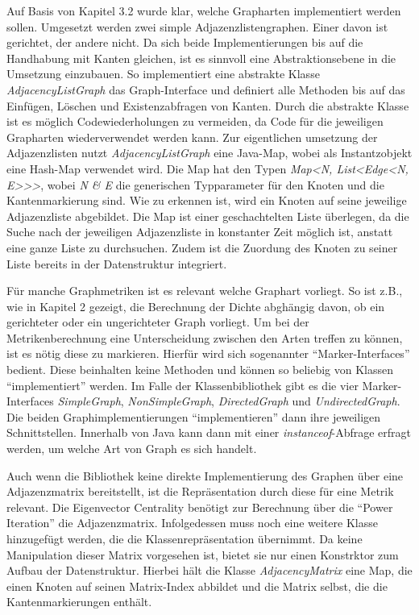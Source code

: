 \documentclass[a4paper,12pt,ngerman,chapterprefix=false,listof=totoc,bibliography=totoc]{scrreprt}
\begin{document}
{{{Auf Basis von Kapitel 3.2 wurde klar, welche Grapharten implementiert werden sollen. Umgesetzt werden zwei simple Adjazenzlistengraphen. Einer davon ist gerichtet, der andere nicht. Da sich beide Implementierungen bis auf die Handhabung mit Kanten gleichen, ist es sinnvoll eine Abstraktionsebene in die Umsetzung einzubauen. So implementiert eine abstrakte Klasse \textit{AdjacencyListGraph} das Graph-Interface und definiert alle Methoden bis auf das Einfügen, Löschen und Existenzabfragen von Kanten. Durch die abstrakte Klasse ist es möglich Codewiederholungen zu vermeiden, da Code für die jeweiligen Grapharten wiederverwendet werden kann. Zur eigentlichen umsetzung der Adjazenzlisten nutzt \textit{AdjacencyListGraph} eine Java-Map, wobei als Instantzobjekt eine Hash-Map verwendet wird. Die Map hat den Typen \textit{Map\textless N, List\textless Edge\textless N, E\textgreater\textgreater\textgreater}, wobei \textit{N \& E} die generischen Typparameter für den Knoten und die Kantenmarkierung sind. Wie zu erkennen ist, wird ein Knoten auf seine jeweilige Adjazenzliste abgebildet. Die Map ist einer geschachtelten Liste überlegen, da die Suche nach der jeweiligen Adjazenzliste in konstanter Zeit möglich ist, anstatt eine ganze Liste zu durchsuchen. Zudem ist die Zuordung des Knoten zu seiner Liste bereits in der Datenstruktur integriert.

Für manche Graphmetriken ist es relevant welche Graphart vorliegt. So ist z.B., wie in Kapitel 2 gezeigt, die Berechnung der Dichte abghängig davon, ob ein gerichteter oder ein ungerichteter Graph vorliegt. Um bei der Metrikenberechnung eine Unterscheidung zwischen den Arten treffen zu können, ist es nötig diese zu markieren. Hierfür wird sich sogenannter "`Marker-Interfaces"' bedient. Diese beinhalten keine Methoden und können so beliebig von Klassen "`implementiert"' werden. Im Falle der Klassenbibliothek gibt es die vier Marker-Interfaces \textit{SimpleGraph}, \textit{NonSimpleGraph}, \textit{DirectedGraph} und \textit{UndirectedGraph}. Die beiden Graphimplementierungen "`implementieren"' dann ihre jeweiligen Schnittstellen. Innerhalb von Java kann dann mit einer \textit{instanceof}-Abfrage erfragt werden, um welche Art von Graph es sich handelt.

Auch wenn die Bibliothek keine direkte Implementierung des Graphen über eine Adjazenzmatrix bereitstellt, ist die Repräsentation durch diese für eine Metrik relevant. Die Eigenvector Centrality benötigt zur Berechnung über die "`Power Iteration"' die Adjazenzmatrix. Infolgedessen muss noch eine weitere Klasse hinzugefügt werden, die die Klassenrepräsentation übernimmt. Da keine Manipulation dieser Matrix vorgesehen ist, bietet sie nur einen Konstrktor zum Aufbau der Datenstruktur. Hierbei hält die Klasse \textit{AdjacencyMatrix} eine Map, die einen Knoten auf seinen Matrix-Index abbildet und die Matrix selbst, die die Kantenmarkierungen enthält.

}}}
\end{document}
